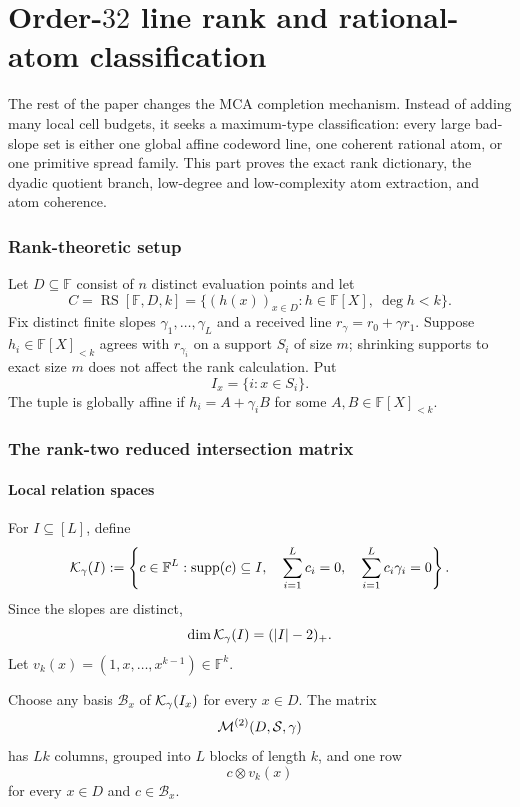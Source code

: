 \documentclass[11pt,a4paper]{amsart}
\numberwithin{equation}{section}
\theoremstyle{remark}
\DeclareMathOperator{\RS}{RS}\DeclareMathOperator{\MCA}{MCA}\DeclareMathOperator{\CA}{CA}
\DeclareMathOperator{\supp}{supp}\DeclareMathOperator{\Fib}{Fib}\DeclareMathOperator{\Sym}{Sym}
\newcommand{\F}{\mathbb F}\newcommand{\B}{\mathbb B}\newcommand{\K}{\mathbb K}\newcommand{\Z}{\mathbb Z}
\newcommand{\vander}[2]{(1,#1,\ldots,#1^{#2-1})}
\begin{document}
\part{Order-\texorpdfstring{$32$}{32} line rank and rational-atom classification}
\label{part:rank-atoms}
The rest of the paper changes the MCA completion mechanism.  Instead of adding many local cell budgets, it seeks a maximum-type classification: every large bad-slope set is either one global affine codeword line, one coherent rational atom, or one primitive spread family.  This part proves the exact rank dictionary, the dyadic quotient branch, low-degree and low-complexity atom extraction, and atom coherence.

\section{Rank-theoretic setup}
Let $D\subseteq\F$ consist of $n$ distinct evaluation points and let
\[
 C=\RS[\F,D,k]
 =\{(h(x))_{x\in D}:h\in\F[X],\ \deg h<k\}.
\]
Fix distinct finite slopes $\gamma_1,\ldots,\gamma_L$ and a received line $r_\gamma=r_0+\gamma r_1$.  Suppose $h_i\in\F[X]_{<k}$ agrees with $r_{\gamma_i}$ on a support $S_i$ of size $m$; shrinking supports to exact size $m$ does not affect the rank calculation.  Put
\[
 I_x=\{i:x\in S_i\}.
\]
The tuple is globally affine if $h_i=A+\gamma_iB$ for some $A,B\in\F[X]_{<k}$.

\section{The rank-two reduced intersection matrix}

\subsection{Local relation spaces}

For $I\subseteq[L]$, define
\[
 \cK_\gamma(I)
 :=\left\{c\in\F^L:
 \supp(c)\subseteq I,\quad
 \sum_{i=1}^Lc_i=0,\quad
 \sum_{i=1}^Lc_i\gamma_i=0
 \right\}.
\]
Since the slopes are distinct,
\[
 \dim\mathcal K_\gamma(I)=(|I|-2)_+.
\]
Let $v_k(x)=\vander{x}{k}\in\F^k$.

\begin{definition}\label{def:r2rim}
Choose any basis $\mathcal B_x$ of $\mathcal K_\gamma(I_x)$ for every $x\in D$.  The matrix
\[
 \mathcal M^{(2)}(D,\mathcal S,\gamma)
\]
has $Lk$ columns, grouped into $L$ blocks of length $k$, and one row
\[
 c\otimes v_k(x)
\]
for every $x\in D$ and $c\in\mathcal B_x$.
\end{definition}
\end{document}
